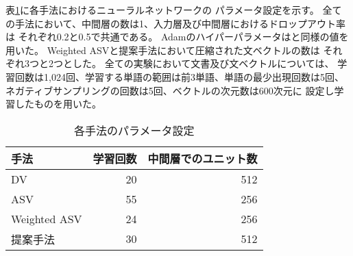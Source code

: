 

表\ref{tab:ParametersOfMethods}に各手法におけるニューラルネットワークの
パラメータ設定を示す。
全ての手法において、中間層の数は1、入力層及び中間層におけるドロップアウト率は
それぞれ0.2と0.5で共通である。
Adam\cite{diederik15}のハイパーパラメータは\cite{diederik15}と同様の値を
用いた。
Weighted ASVと提案手法において圧縮された文ベクトルの数は
それぞれ3つと2つとした。
全ての実験において文書及び文ベクトルについては、
学習回数は1,024回、学習する単語の範囲は前3単語、単語の最少出現回数は5回、
ネガティブサンプリングの回数は5回、ベクトルの次元数は600次元に
設定し学習したものを用いた。

\begin{table}
  \caption{各手法のパラメータ設定}
  \centering
  \begin{tabular}{l | r r} \label{tab:ParametersOfMethods}
    手法 & 学習回数 & 中間層でのユニット数 \\
    \hline
    DV & 20 & 512 \\
    ASV & 55 & 256 \\
    Weighted ASV & 24 & 256 \\
    提案手法 & 30 & 512 \\
  \end{tabular}
\end{table}

